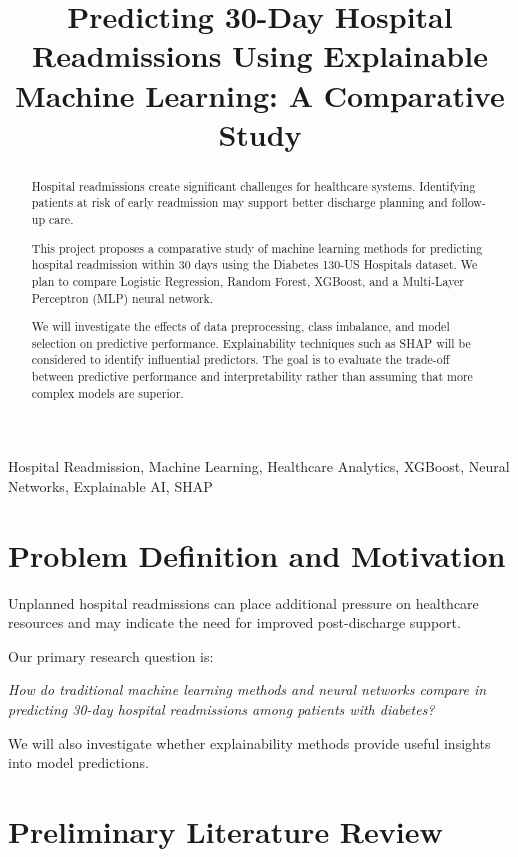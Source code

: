 \documentclass[conference]{IEEEtran}
\title{Predicting 30-Day Hospital Readmissions
Using Explainable Machine Learning:
A Comparative Study}
\author{
\IEEEauthorblockN{
Bahaa Al-Juboori\IEEEauthorrefmark{1},
Shaaz E. Jahan\IEEEauthorrefmark{1},
Jason Fakidis\IEEEauthorrefmark{1}
}
\IEEEauthorblockA{
\IEEEauthorrefmark{1}
British Columbia Institute of Technology\\
Burnaby, BC, Canada
}
}
\begin{document}
\maketitle

\begin{abstract}
Hospital readmissions create significant challenges
for healthcare systems. Identifying patients at risk
of early readmission may support better discharge
planning and follow-up care.

This project proposes a comparative study of machine
learning methods for predicting hospital readmission
within 30 days using the Diabetes 130-US Hospitals
dataset. We plan to compare Logistic Regression,
Random Forest, XGBoost, and a Multi-Layer Perceptron
(MLP) neural network.

We will investigate the effects of data preprocessing,
class imbalance, and model selection on predictive
performance. Explainability techniques such as SHAP
will be considered to identify influential predictors.
The goal is to evaluate the trade-off between
predictive performance and interpretability rather
than assuming that more complex models are superior.
\end{abstract}

\begin{IEEEkeywords}
Hospital Readmission, Machine Learning,
Healthcare Analytics, XGBoost, Neural Networks,
Explainable AI, SHAP
\end{IEEEkeywords}

\section{Problem Definition and Motivation}

Unplanned hospital readmissions can place additional
pressure on healthcare resources and may indicate
the need for improved post-discharge support.

Our primary research question is:

\textit{How do traditional machine learning methods
and neural networks compare in predicting 30-day
hospital readmissions among patients with diabetes?}

We will also investigate whether explainability
methods provide useful insights into model
predictions.

\section{Preliminary Literature Review}
\end{document}
